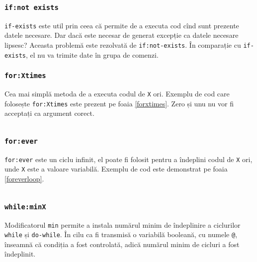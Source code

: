 \subsubsection{\texttt{if:not exists}}

\texttt{if-exists} este util prin ceea că permite de a executa cod cînd sunt prezente datele necesare. Dar dacă este necesar de generat excepție ca datele necesare lipsesc? Aceasta problemă este rezolvată de \texttt{if:not-exists}. În comparație cu \texttt{if-exists}, el nu va trimite date în grupa de comenzi.

\subsubsection{\texttt{for:Xtimes}}

Cea mai simplă metoda de a executa codul de \texttt{X} ori. Exemplu de cod care folosește \texttt{for:Xtimes} este prezent pe foaia \ref{forxtimes}. Zero și unu nu vor fi acceptați ca argument corect.

\begin{sourcecode}
\label{forxtimes}
\inputminted[linenos]{icl}{../sources/forxtimes.icL}
\end{sourcecode}

\subsubsection{\texttt{for:ever}}

\texttt{for:ever} este un ciclu infinit, el poate fi folosit pentru a îndeplini codul de \texttt{X} ori, unde \texttt{X} este a valoare variabilă. Exemplu de cod este demonstrat pe foaia \ref{foreverloop}.

\begin{sourcecode}
\label{foreverloop}
\inputminted[linenos]{icl}{../sources/foreverloop.icL}
\end{sourcecode}

\subsubsection{\texttt{while:minX}}

Modificatorul \texttt{min} permite a instala numărul minim de îndeplinire a ciclurilor \texttt{while} și \texttt{do-while}. În cilu ca fi transmisă o variabilă booleană, cu numele \texttt{@}, \true{} înseamnă că condiția a fost controlată, adică numărul minim de cicluri a fost îndeplinit.

